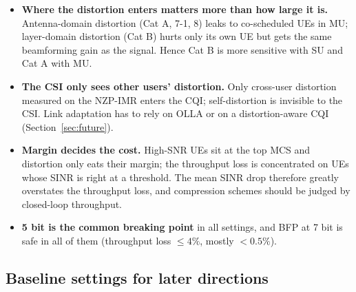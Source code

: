 \documentclass[11pt,a4paper]{article}
\begin{document}
\begin{itemize}
  \item \textbf{Where the distortion enters matters more than how large it is.} Antenna-domain distortion (Cat A, 7-1, 8) leaks to
        co-scheduled UEs in MU; layer-domain distortion (Cat B) hurts only its own UE but gets the same beamforming gain as the
        signal. Hence Cat B is more sensitive with SU and Cat A with MU.
  \item \textbf{The CSI only sees other users' distortion.} Only cross-user distortion measured on the NZP-IMR enters the CQI;
        self-distortion is invisible to the CSI. Link adaptation has to rely on OLLA or on a distortion-aware CQI
        (Section~\ref{sec:future}).
  \item \textbf{Margin decides the cost.} High-SNR UEs sit at the top MCS and distortion only eats their margin; the throughput
        loss is concentrated on UEs whose SINR is right at a threshold. The mean SINR drop therefore greatly overstates the
        throughput loss, and compression schemes should be judged by closed-loop throughput.
  \item \textbf{5 bit is the common breaking point} in all settings, and BFP at 7 bit is safe in all of them (throughput loss
        $\le 4\%$, mostly $< 0.5\%$).
\end{itemize}

\subsection{Baseline settings for later directions}
\end{document}
